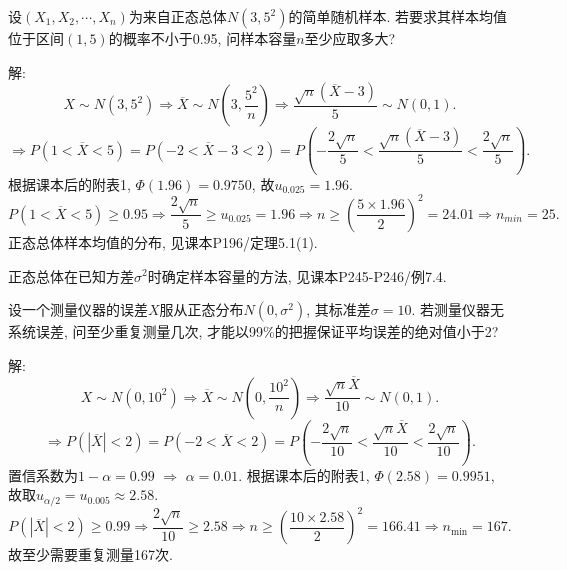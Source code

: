 \documentclass[standard]{ExBook}
\renewenvironment{shaded}{%
  \def\FrameCommand{\fboxsep=\FrameSep \colorbox{shadecolor}}%
  \MakeFramed{\advance\hsize-\width \FrameRestore}%
}{%
  \endMakeFramed
}
\begin{document}
\begin{qitems}
\vspace{2.5cm-5em}

    \begin{bbox}
    \begin{shaded}
        \qitem
设$(X_1,X_2,\cdots,X_n)$为来自正态总体$N(3,5^2)$的简单随机样本. 若要求其样本均值位于区间$(1, 5)$的概率不小于0.95, 问样本容量$n$至少应取多大?
    \end{shaded}
    \end{bbox}

\vspace{\dimexpr2.5cm-5em\relax}

解: 
$$
X\sim N(3,5^2)
\Longrightarrow
\overline{X}\sim N\left(3,\frac{5^2}{n}\right)
\Longrightarrow
\frac{\sqrt{n}(\overline{X}-3)}{5}\sim N(0,1).
$$
$$
\Longrightarrow
P(1<\overline{X}<5)
=P(-2<\overline{X}-3<2)
=P\left(-\frac{2\sqrt{n}}{5}
<
\frac{\sqrt{n}(\overline{X}-3)}{5}
<
\frac{2\sqrt{n}}{5}\right).
$$
根据课本后的附表1, $\Phi(1.96)=0.9750$, 故$u_{0.025}=1.96$. 
$$
P(1<\overline{X}<5)\geq0.95
\Longrightarrow
\frac{2\sqrt{n}}{5}\geq u_{0.025}=1.96
\Longrightarrow
n\geq
\left(\frac{5\times1.96}{2}\right)^2
=24.01
\Longrightarrow
n_{min}=25.
$$
\textcolor{themeColor}{\selectfont {} 正态总体样本均值的分布, 见课本P196/定理5.1(1).}

\textcolor{themeColor}{\selectfont {} 正态总体在已知方差$\sigma^2$时确定样本容量的方法, 见课本P245-P246/例7.4.}

\vspace{2.5cm-5em}

    \begin{bbox}
    \begin{shaded}
        \qitem
设一个测量仪器的误差$X$服从正态分布$N(0,\sigma^2)$, 其标准差$\sigma = 10$. 若测量仪器无系统误差, 问至少重复测量几次, 才能以99\%的把握保证平均误差的绝对值小于2?
    \end{shaded}
    \end{bbox}

\vspace{\dimexpr2.5cm-5em\relax}

解:
$$
X\sim N(0,10^2)
\Longrightarrow
\overline{X}\sim N\left(0,\frac{10^2}{n}\right)
\Longrightarrow
\frac{\sqrt{n}\overline{X}}{10}\sim N(0,1).
$$
$$
\Longrightarrow
P(|\overline{X}|<2)
=
P(-2<\overline{X}<2)
=
P\left(
-\frac{2\sqrt{n}}{10}
<
\frac{\sqrt{n}\overline{X}}{10}
<
\frac{2\sqrt{n}}{10}
\right).
$$
置信系数为$1-\alpha=0.99$ $\Longrightarrow$ $\alpha=0.01$. 根据课本后的附表1, $\Phi(2.58)=0.9951$, 故取$u_{\alpha/2}=u_{0.005}\approx2.58$.
$$
P(|\overline{X}|<2)\geq0.99
\Longrightarrow
\frac{2\sqrt{n}}{10}\geq2.58
\Longrightarrow
n\geq
\left(\frac{10\times2.58}{2}\right)^2
=166.41
\Longrightarrow
n_{\min}=167.
$$
故至少需要重复测量167次.


\end{qitems}
\end{document}
